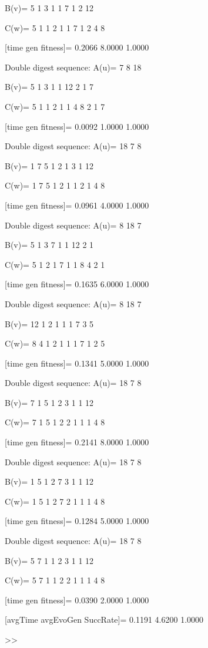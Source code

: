 B(v)=
     5     1     3     1     1     7     1     2    12

C(w)=
     5     1     1     2     1     1     7     1     2     4     8

[time gen fitness]=
    0.2066    8.0000    1.0000

Double digest sequence:
A(u)=
     7     8    18

B(v)=
     5     1     3     1     1    12     2     1     7

C(w)=
     5     1     1     2     1     1     4     8     2     1     7

[time gen fitness]=
    0.0092    1.0000    1.0000

Double digest sequence:
A(u)=
    18     7     8

B(v)=
     1     7     5     1     2     1     3     1    12

C(w)=
     1     7     5     1     2     1     1     2     1     4     8

[time gen fitness]=
    0.0961    4.0000    1.0000

Double digest sequence:
A(u)=
     8    18     7

B(v)=
     5     1     3     7     1     1    12     2     1

C(w)=
     5     1     2     1     7     1     1     8     4     2     1

[time gen fitness]=
    0.1635    6.0000    1.0000

Double digest sequence:
A(u)=
     8    18     7

B(v)=
    12     1     2     1     1     1     7     3     5

C(w)=
     8     4     1     2     1     1     1     7     1     2     5

[time gen fitness]=
    0.1341    5.0000    1.0000

Double digest sequence:
A(u)=
    18     7     8

B(v)=
     7     1     5     1     2     3     1     1    12

C(w)=
     7     1     5     1     2     2     1     1     1     4     8

[time gen fitness]=
    0.2141    8.0000    1.0000

Double digest sequence:
A(u)=
    18     7     8

B(v)=
     1     5     1     2     7     3     1     1    12

C(w)=
     1     5     1     2     7     2     1     1     1     4     8

[time gen fitness]=
    0.1284    5.0000    1.0000

Double digest sequence:
A(u)=
    18     7     8

B(v)=
     5     7     1     1     2     3     1     1    12

C(w)=
     5     7     1     1     2     2     1     1     1     4     8

[time gen fitness]=
    0.0390    2.0000    1.0000

[avgTime  avgEvoGen  SuccRate]=
    0.1191    4.6200    1.0000

>> 